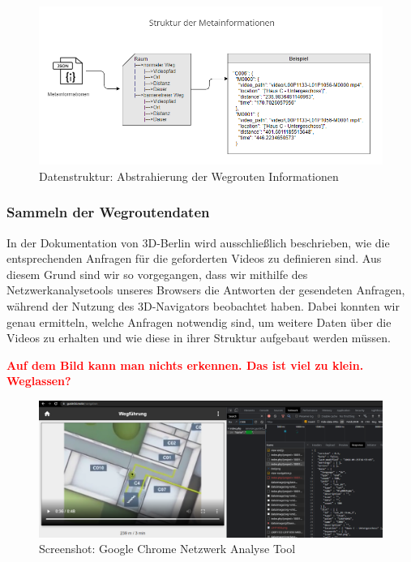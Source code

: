 \begin{figure}[H]
    \includegraphics[width=\textwidth]{Figures/3DNavigator/Metadatenstruktur_Raumfinder.png}
    \caption{Datenstruktur: Abstrahierung der Wegrouten Informationen}
    \label{fig:json-bild}
    \centering
\end{figure}

\subsubsection{Sammeln der Wegroutendaten}

In der Dokumentation von 3D-Berlin wird ausschließlich beschrieben, wie die entsprechenden Anfragen für die geforderten Videos zu definieren sind. Aus diesem Grund sind wir so vorgegangen, dass wir mithilfe des Netzwerkanalysetools unseres Browsers die Antworten der gesendeten Anfragen, während der Nutzung des 3D-Navigators beobachtet haben. Dabei konnten wir genau ermitteln, welche Anfragen notwendig sind, um weitere Daten über die Videos zu erhalten und wie diese in ihrer Struktur aufgebaut werden müssen.

\textcolor{red}{\textbf{Auf dem Bild kann man nichts erkennen. Das ist viel zu klein. Weglassen?}}
\begin{figure}[H]
    \includegraphics[width=\textwidth]{Figures/3DNavigator/analysetool.png}
    \caption{Screenshot: Google Chrome Netzwerk Analyse Tool}
    \label{fig:integration}
    \centering
\end{figure}

